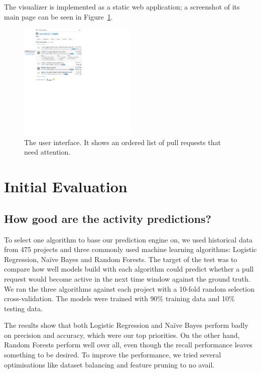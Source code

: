\documentclass[conference]{IEEEtran}
\begin{document}
The visualizer is implemented as a static web application; a
screenshot of its main page can be seen in Figure~\ref{fig:ui}.

\begin{figure}
  \centering
  \includegraphics[width=0.5\textwidth]{../figs/interface.pdf}
  \caption[The user interface]
  {The user interface. It shows an ordered list of pull requests that need attention.}
  \label{fig:ui}
\end{figure}

\section{Initial Evaluation}
\label{sec:evaluation}

\subsection{How good are the activity predictions?}
\label{sec:learning}

To select one algorithm to base our prediction engine on, we used historical
data from 475 projects and three commonly used machine learning algorithms:
Logistic Regression, Na\"ive Bayes and Random Forests. The target of the test
was to compare how well models build with each algorithm could predict whether a
pull request would become active in the next time window against the ground
truth.  We ran the three algorithms against each project with a 10-fold random
selection cross-validation. The models were trained with 90\% training data and
10\% testing data.

The results show that both Logistic Regression and Na\"ive Bayes perform badly
on precision and accuracy, which were our top priorities.  On the other hand,
Random Forests perform well over all, even though the recall performance leaves
something to be desired. To improve the performance, we tried several
optimisations like dataset balancing and feature pruning to no avail.
\end{document}
